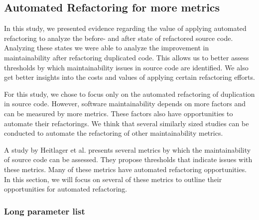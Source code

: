 \subsection{Automated Refactoring for more metrics}
In this study, we presented evidence regarding the value of applying automated refactoring to analyze the before- and after state of refactored source code. Analyzing these states we were able to analyze the improvement in maintainability after refactoring duplicated code. This allows us to better assess thresholds by which maintainability issues in source code are identified. We also get better insights into the costs and values of applying certain refactoring efforts.

For this study, we chose to focus only on the automated refactoring of duplication in source code. However, software maintainability depends on more factors and can be measured by more metrics. These factors also have opportunities to automate their refactorings. We think that several similarly sized studies can be conducted to automate the refactoring of other maintainability metrics.

A study by Heitlager et al. \cite{heitlager2007practical} presents several metrics by which the maintainability of source code can be assessed. They propose thresholds that indicate issues with these metrics. Many of these metrics have automated refactoring opportunities. In this section, we will focus on several of these metrics to outline their opportunities for automated refactoring.

\subsubsection{Long parameter list}

